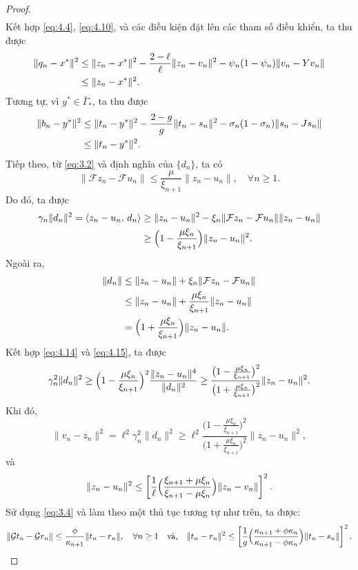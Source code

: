 \documentclass[11pt,a4paper]{article}
\theoremstyle{plain}
\theoremstyle{definition}
\theoremstyle{remark}
\numberwithin{equation}{section}
\newcommand{\Fc}{\mathcal{F}}
\newcommand{\Gc}{\mathcal{G}}
\newcommand{\inp}[2]{\langle #1,\,#2\rangle}
\newcommand{\nm}[1]{\lVert #1\rVert}
\newcommand{\Gams}{\bar{\Gamma}_{*}}
\begin{document}
\begin{proof}
\begin{align}
\end{align}
Kết hợp \eqref{eq:4.4}, \eqref{eq:4.10}, và các điều kiện đặt lên các tham số điều khiển, ta thu được
\begin{align}
\nm{q_n-x^{*}}^2 &\le \nm{z_n-x^{*}}^2-\frac{2-\ell}{\ell}\nm{z_n-v_n}^2-\psi_n(1-\psi_n)\nm{v_n-Yv_n}\notag\\
&\le \nm{z_n-x^{*}}^2. \label{eq:4.11}
\end{align}
Tương tự, vì $y^{*}\in\Gams$, ta thu được
\begin{align}
\nm{b_n-y^{*}}^2 &\le \nm{t_n-y^{*}}^2-\frac{2-g}{g}\nm{t_n-s_n}^2-\sigma_n(1-\sigma_n)\nm{s_n-Js_n}\notag\\
&\le \nm{t_n-y^{*}}^2. \label{eq:4.12}
\end{align}
Tiếp theo, từ \eqref{eq:3.2} và định nghĩa của $\{d_n\}$, ta có
\begin{equation}
\nm{\Fc z_n-\Fc u_n}\le\frac{\mu}{\xi_{n+1}}\nm{z_n-u_n},\quad\forall n\ge 1. \label{eq:4.13}
\end{equation}
Do đó, ta được
\begin{align}
\gamma_n\nm{d_n}^2=\inp{z_n-u_n}{d_n} &\ge \nm{z_n-u_n}^2-\xi_n\nm{\Fc z_n-\Fc u_n}\nm{z_n-u_n}\notag\\
&\ge \Bigl(1-\frac{\mu\xi_n}{\xi_{n+1}}\Bigr)\nm{z_n-u_n}^2. \label{eq:4.14}
\end{align}
Ngoài ra,
\begin{align}
\nm{d_n} &\le \nm{z_n-u_n}+\xi_n\nm{\Fc z_n-\Fc u_n}\notag\\
&\le \nm{z_n-u_n}+\frac{\mu\xi_n}{\xi_{n+1}}\nm{z_n-u_n}\notag\\
&= \Bigl(1+\frac{\mu\xi_n}{\xi_{n+1}}\Bigr)\nm{z_n-u_n}. \label{eq:4.15}
\end{align}
Kết hợp \eqref{eq:4.14} và \eqref{eq:4.15}, ta được
\[
\gamma_n^2\nm{d_n}^2\ge\Bigl(1-\frac{\mu\xi_n}{\xi_{n+1}}\Bigr)^2\frac{\nm{z_n-u_n}^4}{\nm{d_n}^2}\ge\frac{\bigl(1-\frac{\mu\xi_n}{\xi_{n+1}}\bigr)^2}{\bigl(1+\frac{\mu\xi_n}{\xi_{n+1}}\bigr)^2}\nm{z_n-u_n}^2.
\]
Khi đó,
\[
\nm{v_n-z_n}^2=\ell^2\gamma_n^2\nm{d_n}^2\ge\ell^2\frac{\bigl(1-\frac{\mu\xi_n}{\xi_{n+1}}\bigr)^2}{\bigl(1+\frac{\mu\xi_n}{\xi_{n+1}}\bigr)^2}\nm{z_n-u_n}^2,
\]
và
\[
\nm{z_n-u_n}^2\le\left[\frac{1}{\ell}\Bigl(\frac{\xi_{n+1}+\mu\xi_n}{\xi_{n+1}-\mu\xi_n}\Bigr)\nm{z_n-v_n}\right]^2.
\]
Sử dụng \eqref{eq:3.4} và làm theo một thủ tục tương tự như trên, ta được:
\[
\nm{\Gc t_n-\Gc r_n}\le\frac{\phi}{\kappa_{n+1}}\nm{t_n-r_n},\quad\forall n\ge 1\quad\text{và,}\quad \nm{t_n-r_n}^2\le\left[\frac{1}{g}\Bigl(\frac{\kappa_{n+1}+\phi\kappa_n}{\kappa_{n+1}-\phi\kappa_n}\Bigr)\nm{t_n-s_n}\right]^2.
\]
\end{proof}
\end{document}
